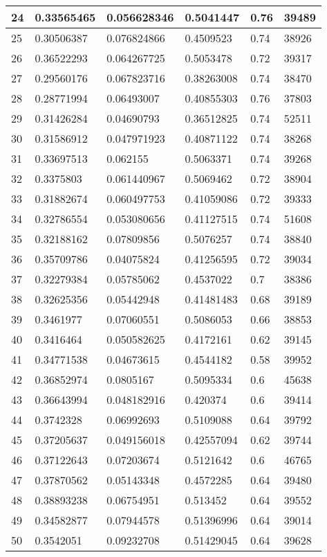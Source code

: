 \begin{longtable}{|l|l|l|l|l|l|}
24 & 0.33565465 & 0.056628346 & 0.5041447 & 0.76 & 39489 \\ \hline 
25 & 0.30506387 & 0.076824866 & 0.4509523 & 0.74 & 38926 \\ \hline 
26 & 0.36522293 & 0.064267725 & 0.5053478 & 0.72 & 39317 \\ \hline 
27 & 0.29560176 & 0.067823716 & 0.38263008 & 0.74 & 38470 \\ \hline 
28 & 0.28771994 & 0.06493007 & 0.40855303 & 0.76 & 37803 \\ \hline 
29 & 0.31426284 & 0.04690793 & 0.36512825 & 0.74 & 52511 \\ \hline 
30 & 0.31586912 & 0.047971923 & 0.40871122 & 0.74 & 38268 \\ \hline 
31 & 0.33697513 & 0.062155 & 0.5063371 & 0.74 & 39268 \\ \hline 
32 & 0.3375803 & 0.061440967 & 0.5069462 & 0.72 & 38904 \\ \hline 
33 & 0.31882674 & 0.060497753 & 0.41059086 & 0.72 & 39333 \\ \hline 
34 & 0.32786554 & 0.053080656 & 0.41127515 & 0.74 & 51608 \\ \hline 
35 & 0.32188162 & 0.07809856 & 0.5076257 & 0.74 & 38840 \\ \hline 
36 & 0.35709786 & 0.04075824 & 0.41256595 & 0.72 & 39034 \\ \hline 
37 & 0.32279384 & 0.05785062 & 0.4537022 & 0.7 & 38386 \\ \hline 
38 & 0.32625356 & 0.05442948 & 0.41481483 & 0.68 & 39189 \\ \hline 
39 & 0.3461977 & 0.07060551 & 0.5086053 & 0.66 & 38853 \\ \hline 
40 & 0.3416464 & 0.050582625 & 0.4172161 & 0.62 & 39145 \\ \hline 
41 & 0.34771538 & 0.04673615 & 0.4544182 & 0.58 & 39952 \\ \hline 
42 & 0.36852974 & 0.0805167 & 0.5095334 & 0.6 & 45638 \\ \hline 
43 & 0.36643994 & 0.048182916 & 0.420374 & 0.6 & 39414 \\ \hline 
44 & 0.3742328 & 0.06992693 & 0.5109088 & 0.64 & 39792 \\ \hline 
45 & 0.37205637 & 0.049156018 & 0.42557094 & 0.62 & 39744 \\ \hline 
46 & 0.37122643 & 0.07203674 & 0.5121642 & 0.6 & 46765 \\ \hline 
47 & 0.37870562 & 0.05143348 & 0.4572285 & 0.64 & 39480 \\ \hline 
48 & 0.38893238 & 0.06754951 & 0.513452 & 0.64 & 39552 \\ \hline 
49 & 0.34582877 & 0.07944578 & 0.51396996 & 0.64 & 39014 \\ \hline 
50 & 0.3542051 & 0.09232708 & 0.51429045 & 0.64 & 39628 \\ \hline 
\end{longtable}